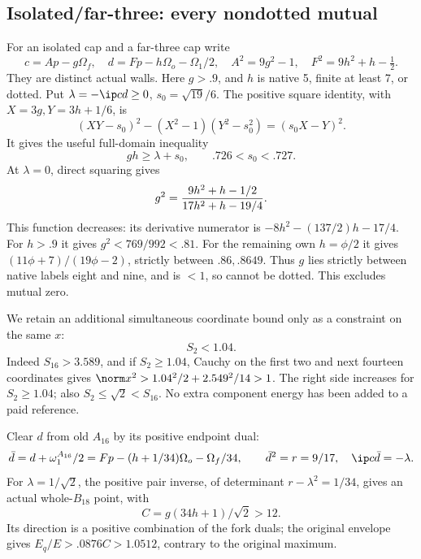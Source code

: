 \subsection{Isolated/far-three: every nondotted mutual}
\label{app:D18isolatedfarfinite}

For an isolated cap and a far-three cap write
\[
 c=Ap-g\Omega_f,\quad
 d=Fp-h\Omega_o-\Omega_1/2,\quad
 A^2=9g^2-1,\quad F^2=9h^2+h-\tfrac12 .
\]
They are distinct actual walls.  Here \(g>.9\), and \(h\) is
native 5, finite at least 7, or dotted.
Put \(\lambda=-\ip cd\ge0\), \(s_0=\sqrt{19}/6\).
The positive square identity, with
\(X=3g,Y=3h+1/6\), is
\[
 (XY-s_0)^2-(X^2-1)(Y^2-s_0^2)=(s_0X-Y)^2 .
\]
It gives the useful full-domain inequality
\[
                       gh\ge\lambda+s_0,\qquad
                       .726<s_0<.727.
\tag{DIFproduct}\label{eq:DIFproduct}
\]
At \(\lambda=0\), direct squaring gives
\[
 g^2={9h^2+h-1/2\over17h^2+h-19/4}.
\]
This function decreases: its derivative numerator is
\(-8h^2-(137/2)h-17/4\).
For \(h>.9\) it gives \(g^2<769/992<.81\).
For the remaining own \(h=\phi/2\) it gives
\((11\phi+7)/(19\phi-2)\), strictly between \(.86,.8649\).
Thus \(g\) lies strictly between native labels eight and nine,
and is \(<1\), so cannot be dotted.  This excludes mutual zero.

We retain an additional simultaneous coordinate bound only as a
constraint on the same \(x\):
\[
                            S_2<1.04 .
\tag{DIFS2}\label{eq:DIFS2}
\]
Indeed \(S_{16}>3.589\), and if \(S_2\ge1.04\), Cauchy on
the first two and next fourteen coordinates gives
\(\norm x^2>1.04^2/2+2.549^2/14>1\).
The right side increases for \(S_2\ge1.04\);
also \(S_2\le\sqrt2<S_{16}\).
No extra component energy has been added to a paid reference.

Clear \(d\) from old \(A_{16}\) by its positive endpoint dual:
\[
 \bar d=d+\omega_1^{A_{16}}/2
       =Fp-(h+1/34)\Omega_o-\Omega_f/34,\qquad
 \bar d^2=r=9/17,\quad \ip c{\bar d}=-\lambda.
\]
For \(\lambda=1/\sqrt2\), the positive pair inverse, of determinant
\(r-\lambda^2=1/34\), gives an actual whole-\(B_{18}\) point,
with
\[
                          C=g(34h+1)/\sqrt2>12 .
\]
Its direction is a positive combination of the fork duals;
the original envelope gives \(E_q/E>.0876C>1.0512\),
contrary to the original maximum.

